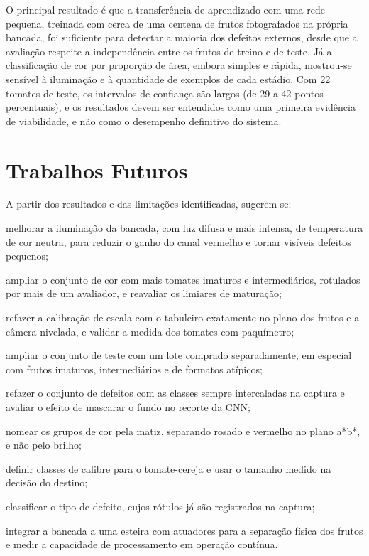 O principal resultado é que a transferência de aprendizado com uma rede pequena, treinada com cerca de uma centena de frutos fotografados na própria bancada, foi suficiente para detectar a maioria dos defeitos externos, desde que a avaliação respeite a independência entre os frutos de treino e de teste. Já a classificação de cor por proporção de área, embora simples e rápida, mostrou-se sensível à iluminação e à quantidade de exemplos de cada estádio. Com 22 tomates de teste, os intervalos de confiança são largos (de 29 a 42 pontos percentuais), e os resultados devem ser entendidos como uma primeira evidência de viabilidade, e não como o desempenho definitivo do sistema.

\section{Trabalhos Futuros}

A partir dos resultados e das limitações identificadas, sugerem-se:
\begin{alineas}
	\item melhorar a iluminação da bancada, com luz difusa e mais intensa, de temperatura de cor neutra, para reduzir o ganho do canal vermelho e tornar visíveis defeitos pequenos;
	\item ampliar o conjunto de cor com mais tomates imaturos e intermediários, rotulados por mais de um avaliador, e reavaliar os limiares de maturação;
	\item refazer a calibração de escala com o tabuleiro exatamente no plano dos frutos e a câmera nivelada, e validar a medida dos tomates com paquímetro;
	\item ampliar o conjunto de teste com um lote comprado separadamente, em especial com frutos imaturos, intermediários e de formatos atípicos;
	\item refazer o conjunto de defeitos com as classes sempre intercaladas na captura e avaliar o efeito de mascarar o fundo no recorte da CNN;
	\item nomear os grupos de cor pela matiz, separando rosado e vermelho no plano a*b*, e não pelo brilho;
	\item definir classes de calibre para o tomate-cereja e usar o tamanho medido na decisão do destino;
	\item classificar o tipo de defeito, cujos rótulos já são registrados na captura;
	\item integrar a bancada a uma esteira com atuadores para a separação física dos frutos e medir a capacidade de processamento em operação contínua.
\end{alineas}
